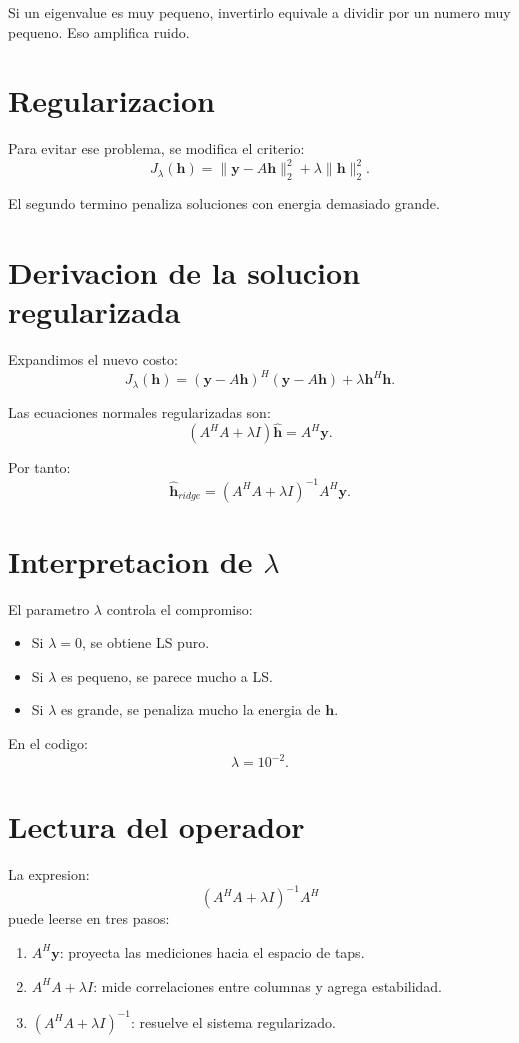 \documentclass[11pt]{article}
\begin{document}
Si un eigenvalue es muy pequeno, invertirlo equivale a dividir por un numero muy
pequeno. Eso amplifica ruido.

\section{Regularizacion}

Para evitar ese problema, se modifica el criterio:
\[
    J_\lambda(\bm h)
    =
    \|\bm y - A\bm h\|_2^2
    +
    \lambda\|\bm h\|_2^2.
\]

El segundo termino penaliza soluciones con energia demasiado grande.

\section{Derivacion de la solucion regularizada}

Expandimos el nuevo costo:
\[
    J_\lambda(\bm h)
    =
    (\bm y - A\bm h)^H(\bm y - A\bm h)
    +
    \lambda \bm h^H\bm h.
\]

Las ecuaciones normales regularizadas son:
\[
    (A^H A + \lambda I)\hat{\bm h}
    =
    A^H\bm y.
\]

Por tanto:
\[
    \hat{\bm h}_{ridge}
    =
    (A^H A + \lambda I)^{-1}A^H\bm y.
\]

\section{Interpretacion de \(\lambda\)}

El parametro \(\lambda\) controla el compromiso:

\begin{itemize}
    \item Si \(\lambda = 0\), se obtiene LS puro.
    \item Si \(\lambda\) es pequeno, se parece mucho a LS.
    \item Si \(\lambda\) es grande, se penaliza mucho la energia de \(\bm h\).
\end{itemize}

En el codigo:
\[
    \lambda = 10^{-2}.
\]

\section{Lectura del operador}

La expresion:
\[
    (A^H A + \lambda I)^{-1}A^H
\]
puede leerse en tres pasos:

\begin{enumerate}
    \item \(A^H\bm y\): proyecta las mediciones hacia el espacio de taps.
    \item \(A^H A + \lambda I\): mide correlaciones entre columnas y agrega estabilidad.
    \item \((A^H A + \lambda I)^{-1}\): resuelve el sistema regularizado.
\end{enumerate}
\end{document}
